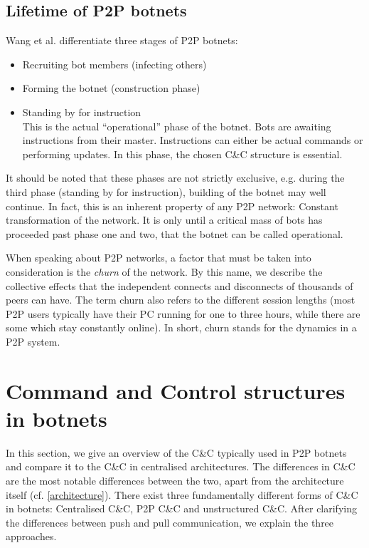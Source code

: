 \documentclass{llncs}
\begin{document}
\subsection{Lifetime of P2P botnets}
Wang et al.\cite{wang2009systematic} differentiate three stages of P2P botnets:
\begin{itemize}
\item Recruiting bot members (infecting others)
\item Forming the botnet (construction phase)
\item Standing by for instruction \\
This is the actual ``operational'' phase of the botnet. Bots are awaiting instructions from their master. Instructions can either be actual commands or performing updates. In this phase, the chosen C\&C structure is essential.
\end{itemize}
It should be noted that these phases are not strictly exclusive,
e.g. during the third phase (standing by for instruction), building of
the botnet may well continue. In fact, this is an inherent property of
any P2P network: Constant transformation of the network. It is only
until a critical mass of bots has proceeded past phase one and two,
that the botnet can be called operational.

When speaking about P2P networks, a factor that must be taken into
consideration is the {\it churn} of the network. By this name, we
describe the collective effects that the independent connects and
disconnects of thousands of peers can have. The term churn also refers
to the different session lengths (most P2P users typically have their
PC running for one to three hours, while there are some which stay
constantly online). In short, churn stands for the dynamics in a P2P
system. \cite{stutzbach2006understanding}

\section{Command and Control structures in botnets}
In this section, we give an overview of the C\&C typically used in P2P
botnets and compare it to the C\&C in centralised architectures. The
differences in C\&C are the most notable differences between the two,
apart from the architecture itself (cf. \ref{architecture}). There
exist three fundamentally different forms of C\&C in botnets:
Centralised C\&C, P2P C\&C and unstructured C\&C. After clarifying the
differences between push and pull communication, we explain the three
approaches.
\end{document}
